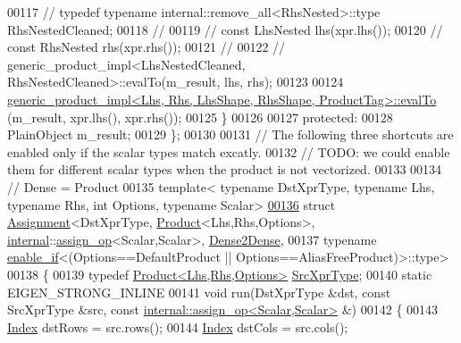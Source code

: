 \begin{DoxyCode}
00117 \textcolor{comment}{//     typedef typename internal::remove\_all<RhsNested>::type RhsNestedCleaned;}
00118 \textcolor{comment}{//     }
00119 \textcolor{comment}{//     const LhsNested lhs(xpr.lhs());}
00120 \textcolor{comment}{//     const RhsNested rhs(xpr.rhs());}
00121 \textcolor{comment}{//   }
00122 \textcolor{comment}{//     generic\_product\_impl<LhsNestedCleaned, RhsNestedCleaned>::evalTo(m\_result, lhs, rhs);}
00123 
00124     \hyperlink{struct_eigen_1_1internal_1_1generic__product__impl}{generic\_product\_impl<Lhs, Rhs, LhsShape, RhsShape, ProductTag>::evalTo}
      (m\_result, xpr.lhs(), xpr.rhs());
00125   \}
00126   
00127 \textcolor{keyword}{protected}:  
00128   PlainObject m\_result;
00129 \};
00130 
00131 \textcolor{comment}{// The following three shortcuts are enabled only if the scalar types match excatly.}
00132 \textcolor{comment}{// TODO: we could enable them for different scalar types when the product is not vectorized.}
00133 
00134 \textcolor{comment}{// Dense = Product}
00135 \textcolor{keyword}{template}< \textcolor{keyword}{typename} DstXprType, \textcolor{keyword}{typename} Lhs, \textcolor{keyword}{typename} Rhs, \textcolor{keywordtype}{int} Options, \textcolor{keyword}{typename} Scalar>
\hyperlink{struct_eigen_1_1internal_1_1_assignment_3_01_dst_xpr_type_00_01_product_3_01_lhs_00_01_rhs_00_01210f0144945968db9352753c942f6951}{00136} \textcolor{keyword}{struct }\hyperlink{struct_eigen_1_1internal_1_1_assignment}{Assignment}<DstXprType, \hyperlink{group___core___module_class_eigen_1_1_product}{Product}<Lhs,Rhs,Options>, 
      \hyperlink{namespaceinternal}{internal}::\hyperlink{struct_eigen_1_1internal_1_1assign__op}{assign\_op}<Scalar,Scalar>, \hyperlink{struct_eigen_1_1internal_1_1_dense2_dense}{Dense2Dense},
00137   typename \hyperlink{struct_eigen_1_1internal_1_1enable__if}{enable\_if}<(Options==DefaultProduct || Options==AliasFreeProduct)>::type>
00138 \{
00139   \textcolor{keyword}{typedef} \hyperlink{group___core___module_class_eigen_1_1_product}{Product<Lhs,Rhs,Options>} \hyperlink{group___core___module_class_eigen_1_1_product}{SrcXprType};
00140   \textcolor{keyword}{static} EIGEN\_STRONG\_INLINE
00141   \textcolor{keywordtype}{void} run(DstXprType &dst, \textcolor{keyword}{const} SrcXprType &src, \textcolor{keyword}{const} 
      \hyperlink{struct_eigen_1_1internal_1_1assign__op}{internal::assign\_op<Scalar,Scalar>} &)
00142   \{
00143     \hyperlink{namespace_eigen_a62e77e0933482dafde8fe197d9a2cfde}{Index} dstRows = src.rows();
00144     \hyperlink{namespace_eigen_a62e77e0933482dafde8fe197d9a2cfde}{Index} dstCols = src.cols();

\end{DoxyCode}
